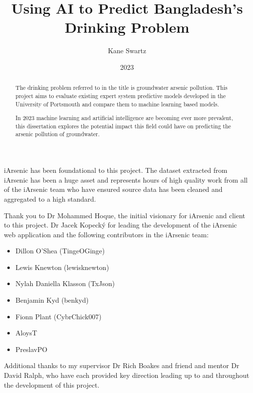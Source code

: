 \documentclass[bsc]{abdnthesis}
\title{Using AI to Predict Bangladesh's Drinking Problem}
\author{Kane Swartz}
\date{2023}
\begin{document}

\maketitle
\makedeclaration


\begin{abstract}
  The drinking problem referred to in the title is groundwater arsenic pollution. This project aims to evaluate existing expert system predictive models developed in the University of Portsmouth and compare them to machine learning based models.

  In 2023 machine learning and artificial intelligence are becoming ever more prevalent, this dissertation explores the potential impact this field could have on predicting the arsenic pollution of groundwater.
\end{abstract}

\begin{acknowledgements}
  iArsenic has been foundational to this project. The dataset extracted from iArsenic has been a huge asset and represents hours of high quality work from all of the iArsenic team who have ensured source data has been cleaned and aggregated to a high standard.

  Thank you to Dr Mohammed Hoque, the initial visionary for iArsenic and client to this project. Dr Jacek Kopecký for leading the development of the iArsenic web application and the following contributors in the iArsenic team:
  \begin{itemize}
      \item Dillon O'Shea (TingeOGinge)
      \item Lewis Knewton (lewisknewton)
      \item Nylah Daniella Klasson (TxJson)
      \item Benjamin Kyd (benkyd)
      \item Fionn Plant (CybrChick007)
      \item AloysT
      \item PreslavPO
  \end{itemize}

  Additional thanks to my supervisor Dr Rich Boakes and friend and mentor Dr David Ralph, who have each provided key direction leading up to and throughout the development of this project.
\end{acknowledgements}
\end{document}

